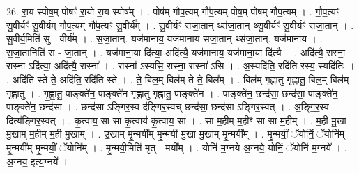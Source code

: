 \documentclass[17pt]{extarticle}
\begin{document}
26. रा॒य स्पोष॒म् पोषꣳ॑ रा॒यो रा॒य स्पोष᳚म् । . पोष॑म् गौप॒त्यम् गौ॑प॒त्यम् पोष॒म् पोष॑म् गौप॒त्यम् । . गौ॒प॒त्यꣳ सु॒वीर्यꣳ॑ सु॒वीर्य॑म् गौप॒त्यम् गौ॑प॒त्यꣳ सु॒वीर्य᳚म् । . सु॒वीर्यꣳ॑ सजा॒तान् थ्स॑जा॒तान् थ्सु॒वीर्यꣳ॑ सु॒वीर्यꣳ॑ सजा॒तान् । . सु॒वीर्य॒मिति॑ सु - वीर्य᳚म् । . स॒जा॒तान्. यज॑मानाय॒ यज॑मानाय सजा॒तान् थ्स॑जा॒तान्. यज॑मानाय । . स॒जा॒तानिति॑ स - जा॒तान् । . यज॑माना॒या दि॑त्या॒ अदि॑त्यै॒ यज॑मानाय॒ यज॑माना॒या दि॑त्यै । . अदि॑त्यै॒ रास्ना॒ रास्ना ऽदि॑त्या॒ अदि॑त्यै॒ रास्ना᳚ । . रास्ना᳚ ऽस्यसि॒ रास्ना॒ रास्ना॑ ऽसि । . अ॒स्यदि॑ति॒ रदि॑ति रस्य॒ स्यदि॑तिः । . अदि॑ति स्ते ते॒ अदि॑ति॒ रदि॑ति स्ते । . ते॒ बिल॒म् बिल॑म् ते ते॒ बिल᳚म् । . बिल॑म् गृह्णातु गृह्णातु॒ बिल॒म् बिल॑म् गृह्णातु । . गृ॒ह्णा॒तु॒ पाङ्क्ते॑न॒ पाङ्क्ते॑न गृह्णातु गृह्णातु॒ पाङ्क्ते॑न । . पाङ्क्ते॑न॒ छन्द॑सा॒ छन्द॑सा॒ पाङ्क्ते॑न॒ पाङ्क्ते॑न॒ छन्द॑सा । . छन्द॑सा ऽङ्गिर॒स्व द॑ङ्गिर॒स्वच् छन्द॑सा॒ छन्द॑सा ऽङ्गिर॒स्वत् । . अ॒ङ्गि॒र॒स्व दित्य॑ङ्गिर॒स्वत् । . कृ॒त्वाय॒ सा सा कृ॒त्वाय॑ कृ॒त्वाय॒ सा । . सा म॒हीम् म॒हीꣳ सा सा म॒हीम् । . म॒ही मु॒खा मु॒खाम् म॒हीम् म॒ही मु॒खाम् । . उ॒खाम् मृ॒न्मयी᳚म् मृ॒न्मयी॑ मु॒खा मु॒खाम् मृ॒न्मयी᳚म् । . मृ॒न्मयीं॒ ॅयोनिं॒ ॅयोनि॑म् मृ॒न्मयी᳚म् मृ॒न्मयीं॒ ॅयोनि᳚म् । . मृ॒न्मयी॒मिति॑ मृत् - मयी᳚म् । . योनि॑ म॒ग्नये॑ अ॒ग्नये॒ योनिं॒ ॅयोनि॑ म॒ग्नये᳚ । . अ॒ग्नय॒ इत्य॒ग्नये᳚ । \newline
\end{document}

